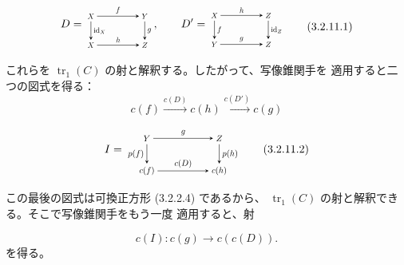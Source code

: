 \begin{equation}
  \begin{gathered}
  D=
  \begin{tikzpicture}[>=stealth,baseline=(current bounding box.center),scale=0.68,
    every node/.style={transform shape}]
    \node (X1) at (0,1.35) {$X$}; \node (Y) at (2.5,1.35) {$Y$};
    \node (X2) at (0,0) {$X$}; \node (Z) at (2.5,0) {$Z$};
    \draw[->] (X1) -- node[above] {$f$} (Y);
    \draw[->] (X1) -- node[right] {$\operatorname{id}_X$} (X2);
    \draw[->] (Y) -- node[right] {$g$} (Z);
    \draw[->] (X2) -- node[above] {$h$} (Z);
  \end{tikzpicture},
  \qquad
  D'=
  \begin{tikzpicture}[>=stealth,baseline=(current bounding box.center),scale=0.68,
    every node/.style={transform shape}]
    \node (X) at (0,1.35) {$X$}; \node (Z1) at (2.5,1.35) {$Z$};
    \node (Y) at (0,0) {$Y$}; \node (Z2) at (2.5,0) {$Z$};
    \draw[->] (X) -- node[above] {$h$} (Z1);
    \draw[->] (X) -- node[right] {$f$} (Y);
    \draw[->] (Z1) -- node[right] {$\operatorname{id}_Z$} (Z2);
    \draw[->] (Y) -- node[above] {$g$} (Z2);
  \end{tikzpicture}
  \end{gathered}
  \tag{3.2.11.1}
\end{equation}

これらを $\operatorname{tr}_1(C)$ の射と解釈する。したがって、写像錐関手を
適用すると二つの図式を得る：
\[
  c(f)\xrightarrow{c(D)}c(h)\xrightarrow{c(D')}c(g)
\]

\begin{equation}
  I=
  \begin{tikzpicture}[>=stealth,baseline=(current bounding box.center),scale=0.76,
    every node/.style={transform shape}]
    \node (Y) at (0,1.35) {$Y$}; \node (Z) at (3.0,1.35) {$Z$};
    \node (Cf) at (0,0) {$c(f)$}; \node (Ch) at (3.0,0) {$c(h)$};
    \draw[->] (Y) -- node[above] {$g$} (Z);
    \draw[->] (Y) -- node[left] {$p(f)$} (Cf);
    \draw[->] (Z) -- node[right] {$p(h)$} (Ch);
    \draw[->] (Cf) -- node[above] {$c(D)$} (Ch);
  \end{tikzpicture}
  \tag{3.2.11.2}
\end{equation}

この最後の図式は可換正方形 (3.2.2.4) であるから、
$\operatorname{tr}_1(C)$ の射と解釈できる。そこで写像錐関手をもう一度
適用すると、射

\begin{equation}
  c(I)\colon c(g)\longrightarrow c(c(D)).
  \tag{3.2.11.3}
\end{equation}
を得る。
\endgroup
